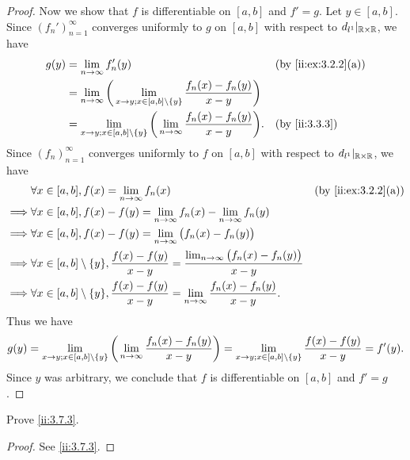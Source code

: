 \begin{proof}
  Now we show that \(f\) is differentiable on \([a, b]\) and \(f' = g\).
  Let \(y \in [a, b]\).
  Since \((f_n')_{n = 1}^\infty\) converges uniformly to \(g\) on \([a, b]\) with respect to \(d_{l^1}|_{\mathbb{R} \times \mathbb{R}}\), we have
  \begin{align*}
    g(y) & = \lim_{n \to \infty} f_n'(y)                                                                                     &  & \by{ii:ex:3.2.2}[a] \\
         & = \lim_{n \to \infty} \bigg(\lim_{x \to y ; x \in [a, b] \setminus \set{y}} \dfrac{f_n(x) - f_n(y)}{x - y}\bigg)                           \\
         & = \lim_{x \to y ; x \in [a, b] \setminus \set{y}} \bigg(\lim_{n \to \infty} \dfrac{f_n(x) - f_n(y)}{x - y}\bigg). &  & \by{ii:3.3.3}
  \end{align*}
  Since \((f_n)_{n = 1}^\infty\) converges uniformly to \(f\) on \([a, b]\) with respect to \(d_{l^1}|_{\mathbb{R} \times \mathbb{R}}\), we have
  \begin{align*}
             & \forall x \in [a, b], f(x) = \lim_{n \to \infty} f_n(x)                                                                           &  & \by{ii:ex:3.2.2}[a] \\
    \implies & \forall x \in [a, b], f(x) - f(y) = \lim_{n \to \infty} f_n(x) - \lim_{n \to \infty} f_n(y)                                                                \\
    \implies & \forall x \in [a, b], f(x) - f(y) = \lim_{n \to \infty} \big(f_n(x) - f_n(y)\big)                                                                          \\
    \implies & \forall x \in [a, b] \setminus \set{y}, \dfrac{f(x) - f(y)}{x - y} = \dfrac{\lim_{n \to \infty} \big(f_n(x) - f_n(y)\big)}{x - y}                          \\
    \implies & \forall x \in [a, b] \setminus \set{y}, \dfrac{f(x) - f(y)}{x - y} = \lim_{n \to \infty} \dfrac{f_n(x) - f_n(y)}{x - y}.
  \end{align*}
  Thus we have
  \[
    g(y) = \lim_{x \to y ; x \in [a, b] \setminus \left\lbrace y\right\rbrace} \bigg(\lim_{n \to \infty} \dfrac{f_n(x) - f_n(y)}{x - y}\bigg) = \lim_{x \to y ; x \in [a, b] \setminus \left\lbrace y\right\rbrace} \dfrac{f(x) - f(y)}{x - y} = f'(y).
  \]
  Since \(y\) was arbitrary, we conclude that \(f\) is differentiable on \([a, b]\) and \(f' = g\).
\end{proof}

\begin{ex}\label{ii:ex:3.7.3}
  Prove \cref{ii:3.7.3}.
\end{ex}

\begin{proof}
  See \cref{ii:3.7.3}.
\end{proof}
